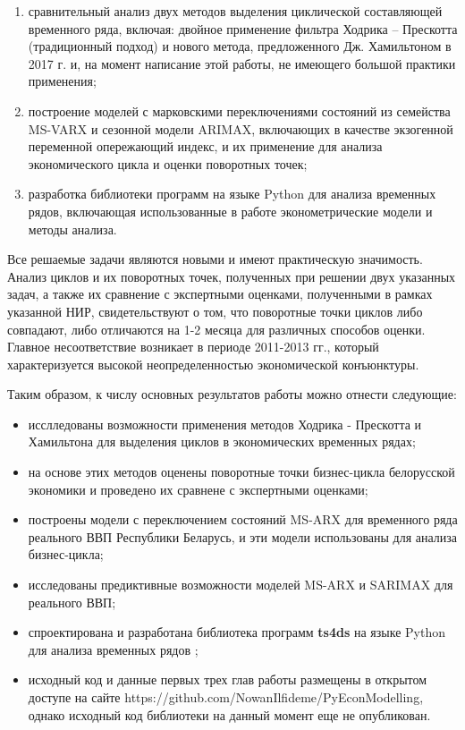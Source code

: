 \documentclass[../report.tex]{subfiles}
\begin{document}
{\begin{enumerate}
		\item   сравнительный анализ двух методов выделения циклической составляющей временного ряда, включая: двойное применение фильтра Ходрика – Прескотта (традиционный подход) и нового метода, предложенного Дж. Хамильтоном в 2017 г.  и, на момент написание этой работы, не имеющего большой практики применения;
		\item   построение моделей с марковскими переключениями состояний из семейства MS-VARX и сезонной модели ARIMAX, включающих в качестве экзогенной переменной опережающий индекс, и их применение для анализа экономического цикла и оценки поворотных точек;
		\item   разработка библиотеки программ на языке Python для анализа временных рядов, включающая использованные в работе эконометрические модели и методы анализа.
		\end{enumerate}

		Все решаемые задачи являются новыми и имеют практическую значимость. Анализ циклов и их поворотных точек, полученных при решении двух указанных задач, а также их сравнение с экспертными оценками, полученными в рамках указанной НИР, свидетельствуют о том, что поворотные точки циклов либо совпадают, либо отличаются на 1-2 месяца для различных способов оценки. Главное несоответствие  возникает в периоде 2011-2013 гг., который характеризуется высокой неопределенностью экономической конъюнктуры.
		
		Таким образом, к числу основных результатов работы можно отнести следующие:
		
		\begin{itemize}
			\item исслледованы возможности применения методов Ходрика - Прескотта и Хамильтона для выделения циклов в экономических временных рядах;
			\item на основе этих методов оценены поворотные точки бизнес-цикла белорусской экономики и проведено их сравнене с экспертными оценками;
			\item построены модели с переключением состояний MS-ARX для временного ряда реального ВВП Республики Беларусь, и эти модели использованы для анализа бизнес-цикла;
			\item исследованы предиктивные возможности моделей MS-ARX и SARIMAX для реального ВВП;
			\item спроектирована и разработана библиотека программ \textbf{ts4ds} на языке Python для анализа временных рядов ;
			\item исходный код и данные  первых трех глав работы размещены в открытом доступе на сайте {https://github.com/NowanIlfideme/PyEconModelling}, однако исходный код библиотеки на данный момент еще не опубликован.
		\end{itemize}
	
}
\end{document}
